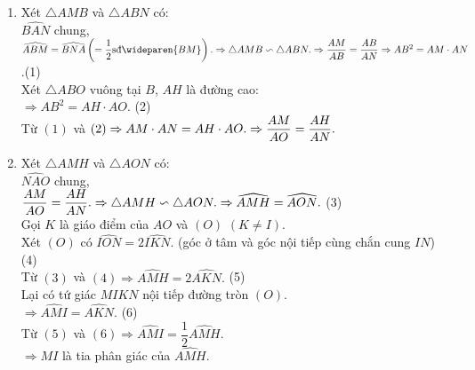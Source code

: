\begin{ex}
{\begin{enumerate}
					$\Rightarrow \widehat {ABO}+\widehat {ACO}=180^{\circ}.$\\
					mà $\widehat {ABO},\widehat {ACO}$ ở vị trí đối nhau.\\
					$\Rightarrow$ tứ giác $ABOC$ nội tiếp.
			\item Xét $\triangle AMB$ và $\triangle ABN$ có:\\
					$\widehat {BAN}$ chung,\\
					$\widehat {ABM}=\widehat {BNA}\left(=\dfrac{1}{2}\text{sđ}\wideparen {BM}\right).\\
					\Rightarrow \triangle AMB \backsim \triangle ABN.\\
					\Rightarrow \dfrac{AM}{AB}=\dfrac{AB}{AN}\\
					\Rightarrow AB^2=AM\cdot{AN}$.\hfill(1)\\
					Xét $\triangle ABO$ vuông tại $B$, $AH$ là đường cao:\\
					$\Rightarrow AB^2=AH\cdot{AO}.$ \hfill(2)\\
					Từ $(1)$ và $(2)\Rightarrow AM\cdot{AN}=AH\cdot{AO}.\\
					\Rightarrow \dfrac{AM}{AO}=\dfrac{AH}{AN}.$
			\item Xét $\triangle AMH$ và $\triangle AON$ có:\\
				$\widehat {NAO}$ chung,\\
				$\dfrac{AM}{AO}=\dfrac{AH}{AN}.\\
				\Rightarrow \triangle AMH \backsim \triangle AON.\\
				\Rightarrow \widehat {AMH}=\widehat {AON}.$ \hfill(3)\\
				Gọi $K$ là giáo điểm của $AO$ và $(O)$ $(K\ne I)$.\\
				Xét $(O)$ có $\widehat {ION}=2\widehat {IKN}.$ (góc ở tâm và góc nội tiếp cùng chắn cung $IN$) \hfill(4)\\
				Từ $(3)$ và $(4)\Rightarrow \widehat {AMH}=2\widehat {AKN}.$ \hfill(5)\\
				Lại có tứ giác $MIKN$ nội tiếp đường tròn $(O)$.\\
				$\Rightarrow \widehat {AMI}=\widehat {AKN}$. \hfill(6)\\
				Từ $(5)$ và $(6)\Rightarrow \widehat {AMI}=\dfrac{1}{2}\widehat {AMH}.$\\
				$\Rightarrow MI$ là tia phân giác của $\widehat {AMH}$.			
		\end{enumerate}
		}
\end{ex}
